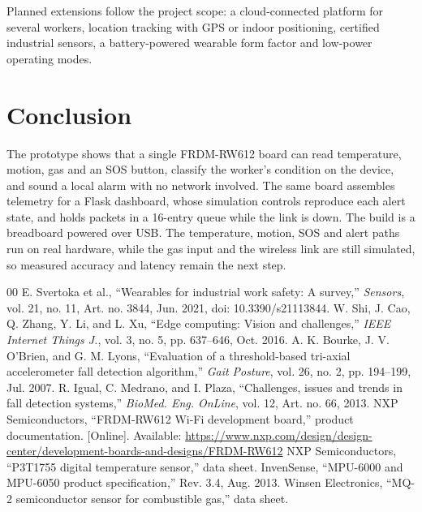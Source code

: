 \documentclass[conference]{IEEEtran}
\begin{document}
Planned extensions follow the project scope: a cloud-connected platform for several workers, location tracking with GPS or indoor positioning, certified industrial sensors, a battery-powered wearable form factor and low-power operating modes.

\section{Conclusion}
\label{sec:conclusion}
The prototype shows that a single FRDM-RW612 board can read temperature, motion, gas and an SOS button, classify the worker's condition on the device, and sound a local alarm with no network involved. The same board assembles telemetry for a Flask dashboard, whose simulation controls reproduce each alert state, and holds packets in a 16-entry queue while the link is down. The build is a breadboard powered over USB. The temperature, motion, SOS and alert paths run on real hardware, while the gas input and the wireless link are still simulated, so measured accuracy and latency remain the next step.

\begin{thebibliography}{00}
 E. Svertoka et al., ``Wearables for industrial work safety: A survey,'' \textit{Sensors}, vol. 21, no. 11, Art. no. 3844, Jun. 2021, doi: 10.3390/s21113844.
 W. Shi, J. Cao, Q. Zhang, Y. Li, and L. Xu, ``Edge computing: Vision and challenges,'' \textit{IEEE Internet Things J.}, vol. 3, no. 5, pp. 637--646, Oct. 2016.
 A. K. Bourke, J. V. O'Brien, and G. M. Lyons, ``Evaluation of a threshold-based tri-axial accelerometer fall detection algorithm,'' \textit{Gait Posture}, vol. 26, no. 2, pp. 194--199, Jul. 2007.
 R. Igual, C. Medrano, and I. Plaza, ``Challenges, issues and trends in fall detection systems,'' \textit{BioMed. Eng. OnLine}, vol. 12, Art. no. 66, 2013.
 NXP Semiconductors, ``FRDM-RW612 Wi-Fi development board,'' product documentation. [Online]. Available: \url{https://www.nxp.com/design/design-center/development-boards-and-designs/FRDM-RW612}
 NXP Semiconductors, ``P3T1755 digital temperature sensor,'' data sheet.
 InvenSense, ``MPU-6000 and MPU-6050 product specification,'' Rev. 3.4, Aug. 2013.
 Winsen Electronics, ``MQ-2 semiconductor sensor for combustible gas,'' data sheet.
\end{thebibliography}
\end{document}
